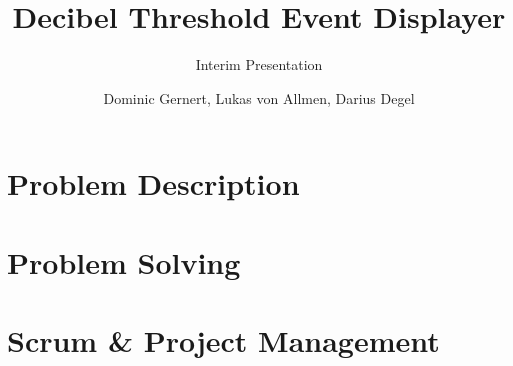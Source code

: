 \documentclass[authorontitle=true]{bfhbeamer}
\title{Decibel Threshold Event Displayer}
\subtitle{Interim Presentation}
\author{Dominic Gernert, Lukas von Allmen, Darius Degel}
\begin{document}
    \maketitle
    
    \section{Problem Description}
    
    \section{Problem Solving}
    
    \section{Scrum \& Project Management}
    
\end{document}
